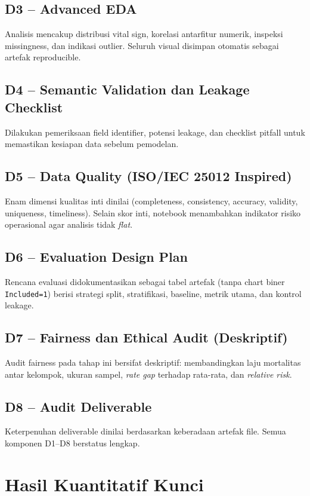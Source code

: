 \documentclass[conference]{IEEEtran}
\begin{document}
\subsection{D3 -- Advanced EDA}
Analisis mencakup distribusi vital sign, korelasi antarfitur numerik, inspeksi missingness, dan indikasi outlier. Seluruh visual disimpan otomatis sebagai artefak reproducible.

\subsection{D4 -- Semantic Validation dan Leakage Checklist}
Dilakukan pemeriksaan field identifier, potensi leakage, dan checklist pitfall untuk memastikan kesiapan data sebelum pemodelan.

\subsection{D5 -- Data Quality (ISO/IEC 25012 Inspired)}
Enam dimensi kualitas inti dinilai (completeness, consistency, accuracy, validity, uniqueness, timeliness). Selain skor inti, notebook menambahkan indikator risiko operasional agar analisis tidak \textit{flat}.

\subsection{D6 -- Evaluation Design Plan}
Rencana evaluasi didokumentasikan sebagai tabel artefak (tanpa chart biner \texttt{Included=1}) berisi strategi split, stratifikasi, baseline, metrik utama, dan kontrol leakage.

\subsection{D7 -- Fairness dan Ethical Audit (Deskriptif)}
Audit fairness pada tahap ini bersifat deskriptif: membandingkan laju mortalitas antar kelompok, ukuran sampel, \textit{rate gap} terhadap rata-rata, dan \textit{relative risk}.

\subsection{D8 -- Audit Deliverable}
Keterpenuhan deliverable dinilai berdasarkan keberadaan artefak file. Semua komponen D1--D8 berstatus lengkap.

\section{Hasil Kuantitatif Kunci}
\end{document}
